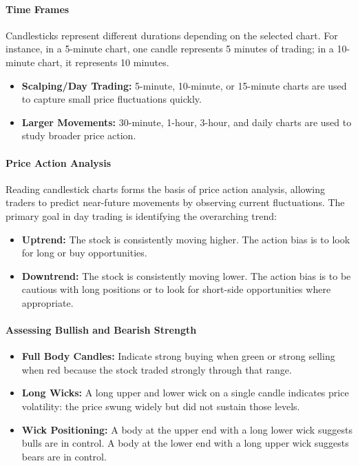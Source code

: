 \documentclass[12pt,openany]{book}
\begin{document}
\paragraph{Time Frames}
Candlesticks represent different durations depending on the selected chart. For instance, in a 5-minute chart, one candle represents 5 minutes of trading; in a 10-minute chart, it represents 10 minutes.

\begin{itemize}[leftmargin=*]
    \item \textbf{Scalping/Day Trading:} 5-minute, 10-minute, or 15-minute charts are used to capture small price fluctuations quickly.
    \item \textbf{Larger Movements:} 30-minute, 1-hour, 3-hour, and daily charts are used to study broader price action.
\end{itemize}

\paragraph{Price Action Analysis}
Reading candlestick charts forms the basis of price action analysis, allowing traders to predict near-future movements by observing current fluctuations. The primary goal in day trading is identifying the overarching trend:

\begin{itemize}[leftmargin=*]
    \item \textbf{Uptrend:} The stock is consistently moving higher. The action bias is to look for long or buy opportunities.
    \item \textbf{Downtrend:} The stock is consistently moving lower. The action bias is to be cautious with long positions or to look for short-side opportunities where appropriate.
\end{itemize}

\paragraph{Assessing Bullish and Bearish Strength}
\begin{itemize}[leftmargin=*]
    \item \textbf{Full Body Candles:} Indicate strong buying when green or strong selling when red because the stock traded strongly through that range.
    \item \textbf{Long Wicks:} A long upper and lower wick on a single candle indicates price volatility: the price swung widely but did not sustain those levels.
    \item \textbf{Wick Positioning:} A body at the upper end with a long lower wick suggests bulls are in control. A body at the lower end with a long upper wick suggests bears are in control.
\end{itemize}
\end{document}
